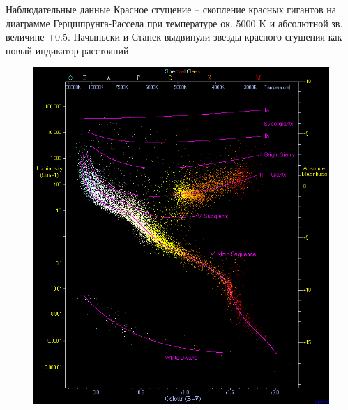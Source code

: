 \documentclass{beamer}
\begin{document}
\begin{frame}{Наблюдательные данные}
        Красное сгущение -- скопление красных гигантов на диаграмме Герцшпрунга-Рассела при температуре ок. 5000 K и абсолютной зв. величине +0.5. Пачыньски и Станек выдвинули звезды красного сгущения как новый индикатор расстояний.
	\begin{center}
	\begin{figure}[h]
\begin{minipage}[h]{0.8\linewidth}
\includegraphics[width=1\linewidth]{../imgs/HRDiagram.png}
\end{minipage}
\end{figure}
	\end{center}

\end{frame}
\end{document}
